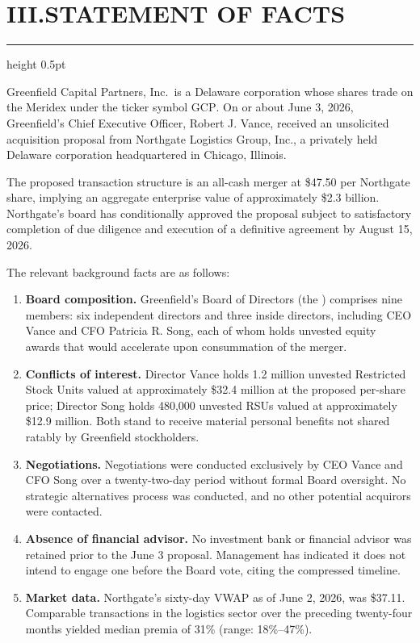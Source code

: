 \section*{III.\quad STATEMENT OF FACTS}

{\color{rule}\hrule height 0.5pt}\vspace{6pt}

Greenfield Capital Partners, Inc.\ is a Delaware corporation whose shares trade on the Meridex under the ticker symbol \textsc{GCP}.  On or about June 3, 2026, Greenfield's Chief Executive Officer, Robert J. Vance, received an unsolicited acquisition proposal from Northgate Logistics Group, Inc., a privately held Delaware corporation headquartered in Chicago, Illinois.

The proposed transaction structure is an all-cash merger at \$47.50 per Northgate share, implying an aggregate enterprise value of approximately \$2.3 billion.  Northgate's board has conditionally approved the proposal subject to satisfactory completion of due diligence and execution of a definitive agreement by August 15, 2026.

The relevant background facts are as follows:

\begin{enumerate}
  \item \textbf{Board composition.}  Greenfield's Board of Directors (the ) comprises nine members: six independent directors and three inside directors, including CEO Vance and CFO Patricia R. Song, each of whom holds unvested equity awards that would accelerate upon consummation of the merger.
  \item \textbf{Conflicts of interest.}  Director Vance holds 1.2 million unvested Restricted Stock Units valued at approximately \$32.4 million at the proposed per-share price; Director Song holds 480,000 unvested RSUs valued at approximately \$12.9 million.  Both stand to receive material personal benefits not shared ratably by Greenfield stockholders.
  \item \textbf{Negotiations.}  Negotiations were conducted exclusively by CEO Vance and CFO Song over a twenty-two-day period without formal Board oversight.  No strategic alternatives process was conducted, and no other potential acquirors were contacted.
  \item \textbf{Absence of financial advisor.}  No investment bank or financial advisor was retained prior to the June 3 proposal.  Management has indicated it does not intend to engage one before the Board vote, citing the compressed timeline.
  \item \textbf{Market data.}  Northgate's sixty-day VWAP as of June 2, 2026, was \$37.11.  Comparable transactions in the logistics sector over the preceding twenty-four months yielded median premia of 31\% (range: 18\%--47\%).
\end{enumerate}

\vspace{6pt}

